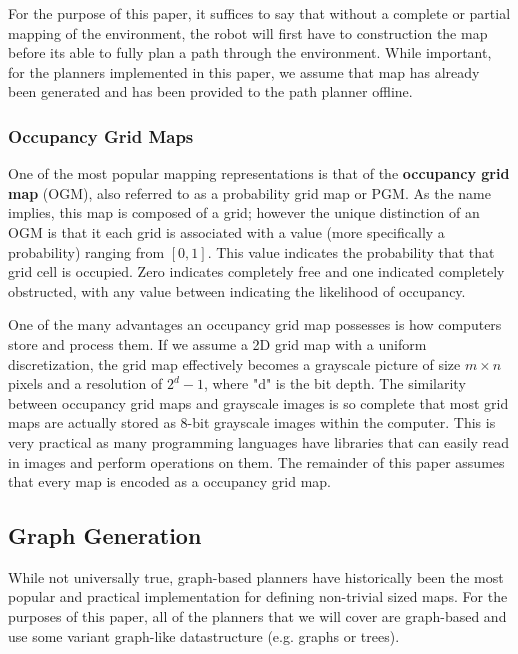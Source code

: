 For the purpose of this paper, it suffices to say that without a complete or partial mapping of the environment, the robot will first have to construction the map before its able to fully plan a path through the environment. While important, for the planners implemented in this paper, we assume that map has already been generated and has been provided to the path planner offline.

\subsubsection{Occupancy Grid Maps}

One of the most popular mapping representations is that of the \textbf{occupancy grid map} (OGM), also referred to as a probability grid map or PGM. As the name implies, this map is composed of a grid; however the unique distinction of an OGM is that it each grid is associated with a value (more specifically a probability) ranging from $[0, 1]$. This value indicates the probability that that grid cell is occupied. Zero indicates completely free and one indicated completely obstructed, with any value between indicating the likelihood of occupancy. 

One of the many advantages an occupancy grid map possesses is how computers store and process them. If we assume a 2D grid map with a uniform discretization, the grid map effectively becomes a grayscale picture of size $m \times n$pixels and a resolution of $2^d-1$, where "d" is the bit depth. The similarity between occupancy grid maps and grayscale images is so complete that most grid maps are actually stored as 8-bit grayscale images within the computer. This is very practical as many programming languages have libraries that can easily read in images and perform operations on them. The remainder of this paper assumes that every map is encoded as a occupancy grid map. 




\subsection{Graph Generation}
While not universally true, graph-based planners have historically been the most popular and practical implementation for defining non-trivial sized maps. For the purposes of this paper, all of the planners that we will cover are graph-based and use some variant graph-like datastructure (e.g. graphs or trees). 

